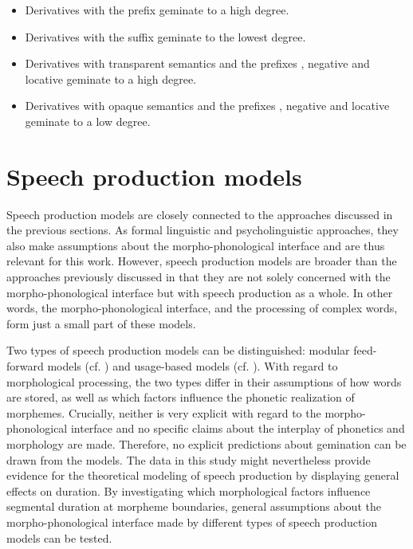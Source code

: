 {			\begin{itemize}
				
				\item Derivatives with the prefix  geminate to a high degree.		
				\item Derivatives with the suffix  geminate to the lowest degree.
				\item  Derivatives with transparent semantics and the prefixes , negative  and locative  geminate to a high degree.	
				\item  Derivatives with opaque semantics and the prefixes , negative  and locative  geminate to a low degree.	\\
			\end{itemize}	



 
\section{Speech production models}\label{speech production models}

Speech production models are closely connected to the approaches discussed in the previous sections. As formal linguistic and psycholinguistic approaches, they also make assumptions about the morpho-phonological interface and are thus relevant for this work. However, speech production models are broader than the approaches previously discussed in that they are not solely concerned with the morpho-phonological interface but with speech production as a whole. In other words, the morpho-phonological interface, and the processing of complex words, form just a small part of these models.

 Two types of  speech production models can be distinguished: modular feed-forward models (cf. \citealt{Levelt.1999,Levelt.1999b,Levelt.2000}) and usage-based models (cf. \citealt{Johnson.1997b,Bybee.2002,Pierrehumbert.2001,Pierrehumbert.2002}). With regard to morphological processing, the two types differ in their assumptions of how words are stored, as well as which factors influence the phonetic realization of morphemes. Crucially, neither is very explicit with regard to the morpho-phonological interface and no specific claims about the interplay of phonetics and morphology are made. Therefore, no explicit predictions about gemination can be drawn from the models. The data in this study might nevertheless provide evidence for the theoretical modeling of  speech production by displaying general effects on duration. By investigating which morphological factors influence segmental duration at morpheme boundaries, general assumptions about the morpho-phonological interface made by different types of speech production models can be tested.

}
